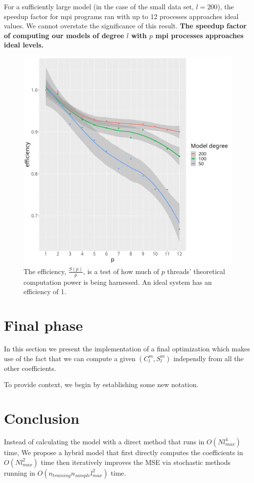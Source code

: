 \documentclass[a4paper]{article}
\theoremstyle{definition}
\begin{document}
For a sufficiently large model (in the case of the small data set, $l = 200$), the speedup factor for mpi programs ran with up to 12 processes approaches ideal values. We cannot
overstate the significance of this result. \textbf{The speedup factor of computing our models of degree $l$ with $p$ mpi processes approaches ideal levels.}

\begin{figure}
    \centering
    \includegraphics[width=0.5\linewidth]{media/mpi_efficieny.png}
    \caption{The efficiency, $\frac{S(p)}{p}$, is a test of how much of $p$ threads' theoretical computation power is
    being harnessed. An ideal system has an efficiency of 1.}

\end{figure}

\section{Final phase}

In this section we present the implementation of a final optimization which makes use of the fact that we can compute a given $(C_l^m, S_l^m)$
independly from all the other coefficients.

To provide context, we begin by establishing some new notation.



\section{Conclusion}

Instead of calculating the model with a direct method that runs in $O(Nl_{max}^4)$ time, We propose a hybrid model that first directly computes the coefficients in $O(Nl_{max}^2)$ time then 
iteratively improves the MSE via stochastic methods running in $O(n_{training}n_{sample}l_{max}^2)$ time.
\end{document}
